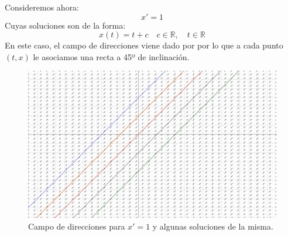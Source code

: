 \begin{ejemplo}
    Consideremos ahora:
    \begin{equation*}
        x' = 1
    \end{equation*}
    Cuyas soluciones son de la forma:
    \begin{equation*}
        x(t) = t + c \quad c\in \mathbb{R}, \quad t\in \mathbb{R}
    \end{equation*}
    En este caso, el campo de direcciones viene dado por
    por lo que a cada punto $(t,x)$ le asociamos una recta a 45º de inclinación.

\ifdefined\showimages
    \begin{figure}[H]
        \centering
        \includegraphics[width=0.6\linewidth]{Imagenes/campo_direcciones_2.png}
        \caption{Campo de direcciones para $x'=1$ y algunas soluciones de la misma.}
    \end{figure}
\fi
\end{ejemplo}

